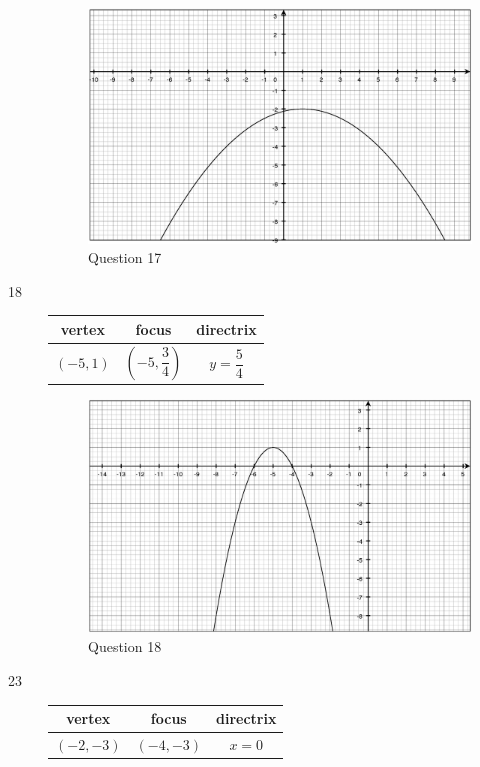 \documentclass[fleqn,addpoints]{exam}
\begin{document}
\begin{description}
\begin{figure}[H]
  \centering
  \includegraphics[scale=.3]{question17.eps}
  \caption*{Question 17}
\end{figure}

\item[18]
\begin{tabular}{ccc}
\toprule
vertex & focus & directrix \\
\midrule
  $(-5, 1)$ & $\left(-5, \dfrac{3}{4} \right)$ & $y = \dfrac{5}{4}$ \\
\bottomrule
\end{tabular}

\begin{figure}[H]
  \centering
  \includegraphics[scale=.3]{question18.eps}
  \caption*{Question 18}
\end{figure}

\item[23]
\begin{tabular}{ccc}
\toprule
vertex & focus & directrix \\
\midrule
  $(-2, -3)$ & $\left(-4, -3 \right)$ & $x = 0$ \\
\bottomrule
\end{tabular}


\end{description}
\end{document}
